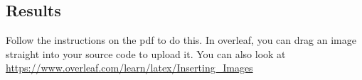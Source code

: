 \documentclass{article}
\begin{document}
\subsection*{Results}
Follow the instructions on the pdf to do this. 
In overleaf, you can drag an image straight into your source code to upload it. You can also look at \url{https://www.overleaf.com/learn/latex/Inserting_Images}


\end{document}
